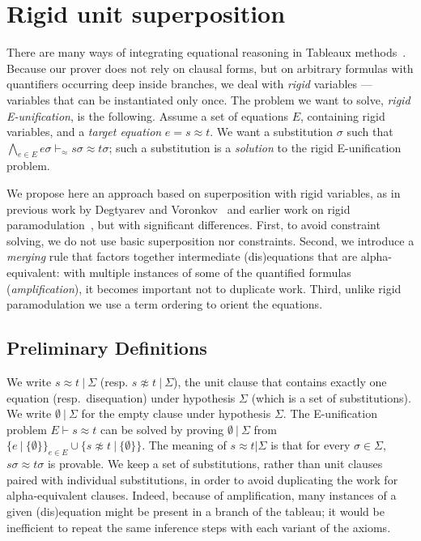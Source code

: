 
\section{Rigid unit superposition}

\EnableBpAbbreviations{}

\newcommand\clauseWithSubst[2]{\ensuremath{#1 ~|~ #2}}
\newcommand\todo[1]{\textcolor{red}{#1}}

There are many ways of integrating equational reasoning in
Tableaux methods~\cite{brand1975proving,letz2002integration,backeman2015theorem,degtyarev1996you}.
Because our prover does not rely on clausal forms, but on arbitrary formulas
with quantifiers occurring deep inside branches,
we deal with {\em rigid} variables --- variables that can be instantiated
only once.
The problem we want to solve, {\em rigid E-unification}, is the following.
Assume a set of equations $E$, containing rigid variables,
and a {\em target equation} $e = s \approx t$.
We want a substitution $\sigma$ such that
$\bigwedge_{e \in E} e\sigma \vdash_\approx s\sigma \approx t\sigma$;
such a substitution is a {\em solution} to the rigid E-unification problem.

We propose here an approach based on superposition with rigid variables,
as in previous work by Degtyarev and Voronkov~\cite{degtyarev1996you}
and earlier work on rigid paramodulation~\cite{plaisted1995special},
but with significant differences.
First, to avoid constraint solving, we do not use
basic superposition nor constraints.
Second, we introduce a {\em merging} rule that factors together
intermediate (dis)equations that are alpha-equivalent:
with multiple instances of some of the quantified formulas ({\em amplification}),
it becomes important not to duplicate work.
Third, unlike rigid paramodulation we use a term ordering to orient the
equations.

\subsection{Preliminary Definitions}


We write $ \clauseWithSubst{ s \approx t }{ \Sigma}$
(resp. $ \clauseWithSubst{ s \not\approx t }{ \Sigma}$),
the unit clause that contains exactly one equation (resp.~disequation)
under hypothesis $\Sigma$ (which is a set of substitutions).
We write $\clauseWithSubst{\emptyset}{\Sigma}$ for the empty clause under hypothesis $\Sigma$.
The E-unification problem $E \vdash s\approx t$ can be solved by
proving $\clauseWithSubst{\emptyset }{ \Sigma}$
from $\{ \clauseWithSubst{e }{ \{ \emptyset \} } \}_{ e \in E }
\cup
\{ \clauseWithSubst{s \not\approx t }{ \{ \emptyset \} } \}$.
The meaning of $s \approx t | \Sigma$ is that for every $\sigma \in \Sigma$,
$s\sigma \approx t\sigma$ is provable.
We keep a set of substitutions, rather than unit clauses paired with
individual substitutions, in order to avoid duplicating the work
for alpha-equivalent clauses.
Indeed, because of amplification, many instances of a given (dis)equation
might be present in a branch of the tableau;
it would be inefficient to repeat the same inference steps with each variant
of the axioms.

